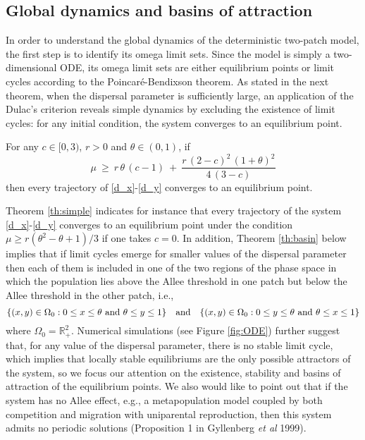 \subsection{Global dynamics and basins of attraction}

\indent In order to understand the global dynamics of the deterministic two-patch model, the first step is to identify its omega
 limit sets.
 Since the model is simply a two-dimensional ODE, its omega limit sets are either equilibrium points or limit cycles according
 to the Poincar\'e-Bendixson theorem.
 As stated in the next theorem, when the dispersal parameter is sufficiently large, an application of the Dulac's criterion
 reveals simple dynamics by excluding the existence of limit cycles: for any initial condition, the system converges to an
 equilibrium point.
\begin{theorem}
\label{th:simple}
 For any $c \in [0, 3)$, $r > 0$ and $\theta \in (0, 1)$, if
\begin{equation}
\label{simple_values}
 \mu \ \geq  \ r \,\theta \,(c - 1) \ + \ \frac{r \,(2 - c)^2 \,(1 + \theta)^2}{4 \,(3 - c)}
\end{equation}
 then every trajectory of \eqref{d_x}-\eqref{d_y} converges to an equilibrium point.
\end{theorem}
 Theorem \ref{th:simple} indicates for instance that every trajectory of the system \eqref{d_x}-\eqref{d_y} converges
 to an equilibrium point under the condition $\mu \geq r (\theta^2 - \theta + 1) / 3$ if one takes $c = 0$.
 In addition, Theorem \ref{th:basin} below implies that if limit cycles emerge for smaller values of the dispersal parameter then
 each of them is included in one of the two regions of the phase space in which the population lies above the Allee threshold in
 one patch but below the Allee threshold in the other patch, i.e.,
 $$ \{(x, y) \in \Omega_0 : 0 \leq x \leq \theta \ \hbox{and} \ \theta \leq y \leq 1 \} \quad \hbox{and} \quad
    \{(x, y) \in \Omega_0 : 0 \leq y \leq \theta \ \hbox{and} \ \theta \leq x \leq 1 \} $$
 where $\Omega_0 = {{\mathbb{R}}}_+^2$.
 Numerical simulations (see Figure \ref{fig:ODE}) further suggest that, for any value of the dispersal parameter, there is no
 stable limit cycle, which implies that locally stable equilibriums are the only possible attractors of the system, so we focus
 our attention on the existence, stability and basins of attraction of the equilibrium points.
 We also would like to point out that if the system has no Allee effect, e.g., a metapopulation model coupled by both competition
 and migration with uniparental reproduction, then this system admits no periodic solutions (Proposition 1 in Gyllenberg \emph{et al} 1999).

